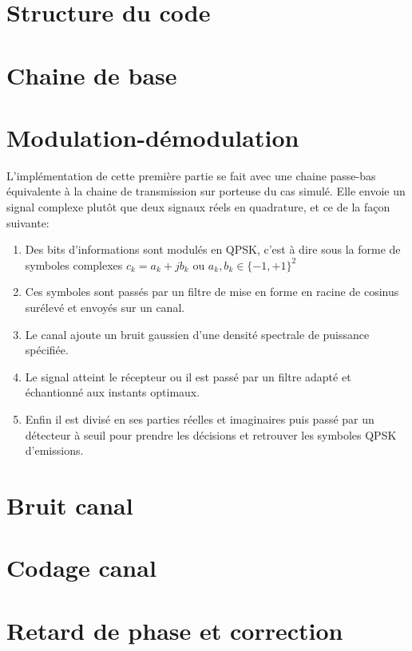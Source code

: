 \documentclass[a4paper,10pt]{article}
\begin{document}
\section{Structure du code}

\section{Chaine de base}



\section{Modulation-démodulation}
L'implémentation de cette première partie se fait avec une chaine passe-bas équivalente à la chaine de transmission sur porteuse du cas simulé. Elle envoie un signal complexe plutôt que deux signaux réels en quadrature, et ce de la façon suivante:
\begin{enumerate}
	\item Des bits d'informations sont modulés en QPSK, c'est à dire sous la forme de symboles complexes $c_k=a_k+jb_k$ ou $a_k,b_k \in \{-1,+1\}^2$
	\item Ces symboles sont passés par un filtre de mise en forme en racine de cosinus surélevé et envoyés sur un canal.
	\item Le canal ajoute un bruit gaussien d'une densité spectrale de puissance spécifiée.
	\item Le signal atteint le récepteur ou il est passé par un filtre adapté et échantionné aux instants optimaux.
	\item Enfin il est divisé en ses parties réelles et imaginaires puis passé par un détecteur à seuil pour prendre les décisions et retrouver les symboles QPSK d'emissions.
\end{enumerate}


\section{Bruit canal}

\section{Codage canal}




\section{Retard de phase et correction}
\end{document}
